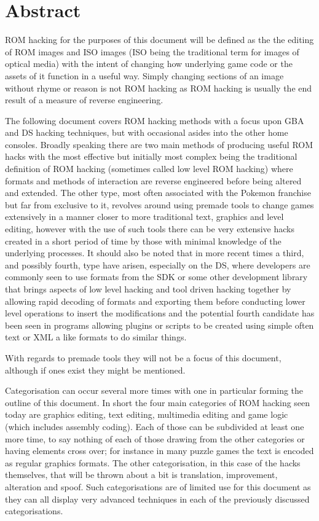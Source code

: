 \documentclass[
]{book}
\begin{document}
\hypertarget{abstract}{%
\section{Abstract}\label{abstract}}

ROM hacking for the purposes of this document will be defined as the the editing of ROM images and ISO images (ISO being the traditional term for images of optical media) with the intent of changing how underlying game code or the assets of it function in a useful way. Simply changing sections of an image without rhyme or reason is not ROM hacking as ROM hacking is usually the end result of a measure of reverse engineering.

The following document covers ROM hacking methods with a focus upon GBA and DS hacking techniques, but with occasional asides into the other home consoles. Broadly speaking there are two main methods of producing useful ROM hacks with the most effective but initially most complex being the traditional definition of ROM hacking (sometimes called low level ROM hacking) where formats and methods of interaction are reverse engineered before being altered and extended. The other type, most often associated with the Pokemon franchise but far from exclusive to it, revolves around using premade tools to change games extensively in a manner closer to more traditional text, graphics and level editing, however with the use of such tools there can be very extensive hacks created in a short period of time by those with minimal knowledge of the underlying processes. It should also be noted that in more recent times a third, and possibly fourth, type have arisen, especially on the DS, where developers are commonly seen to use formats from the SDK or some other development library that brings aspects of low level hacking and tool driven hacking together by allowing rapid decoding of formats and exporting them before conducting lower level operations to insert the modifications and the potential fourth candidate has been seen in programs allowing plugins or scripts to be created using simple often text or XML a like formats to do similar things.

With regards to premade tools they will not be a focus of this document, although if ones exist they might be mentioned.

Categorisation can occur several more times with one in particular forming the outline of this document. In short the four main categories of ROM hacking seen today are graphics editing, text editing, multimedia editing and game logic (which includes assembly coding). Each of those can be subdivided at least one more time, to say nothing of each of those drawing from the other categories or having elements cross over; for instance in many puzzle games the text is encoded as regular graphics formats. The other categorisation, in this case of the hacks themselves, that will be thrown about a bit is translation, improvement, alteration and spoof. Such categorisations are of limited use for this document as they can all display very advanced techniques in each of the previously discussed categorisations.
\end{document}
